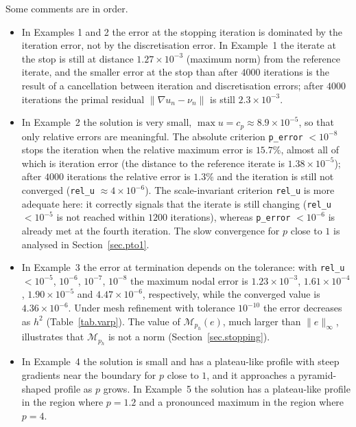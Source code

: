 \documentclass[11pt]{amsart}
\theoremstyle{definition}
\theoremstyle{remark}
\numberwithin{equation}{section}
\begin{document}
Some comments are in order.
\begin{itemize}
\item In Examples 1 and 2 the error at the stopping iteration is dominated by the iteration error, not by the discretisation error. In Example~1 the iterate at the stop is still at distance $1.27\times10^{-3}$ (maximum norm) from the reference iterate, and the smaller error at the stop than after $4000$ iterations is the result of a cancellation between iteration and discretisation errors; after $4000$ iterations the primal residual $\|\nabla u_n-\nu_n\|$ is still $2.3\times10^{-3}$.
\item In Example~2 the solution is very small, $\max u=c_p\approx8.9\times10^{-5}$, so that only relative errors are meaningful. The absolute criterion \texttt{p\_error} $<10^{-8}$ stops the iteration when the relative maximum error is $15.7\%$, almost all of which is iteration error (the distance to the reference iterate is $1.38\times10^{-5}$); after $4000$ iterations the relative error is $1.3\%$ and the iteration is still not converged (\texttt{rel\_u} $\approx4\times10^{-6}$). The scale-invariant criterion \texttt{rel\_u} is more adequate here: it correctly signals that the iterate is still changing (\texttt{rel\_u} $<10^{-5}$ is not reached within $1200$ iterations), whereas \texttt{p\_error} $<10^{-6}$ is already met at the fourth iteration. The slow convergence for $p$ close to $1$ is analysed in Section~\ref{sec.pto1}.
\item In Example~3 the error at termination depends on the tolerance: with \texttt{rel\_u} $<10^{-5}$, $10^{-6}$, $10^{-7}$, $10^{-8}$ the maximum nodal error is $1.23\times10^{-3}$, $1.61\times10^{-4}$, $1.90\times10^{-5}$ and $4.47\times10^{-6}$, respectively, while the converged value is $4.36\times10^{-6}$. Under mesh refinement with tolerance $10^{-10}$ the error decreases as $h^2$ (Table~\ref{tab.varp}). The value of $\mathcal M_{p_h}(e)$, much larger than $\|e\|_\infty$, illustrates that $\mathcal M_{p_h}$ is not a norm (Section~\ref{sec.stopping}).
\item In Example~4 the solution is small and has a plateau-like profile with steep gradients near the boundary for $p$ close to $1$, and it approaches a pyramid-shaped profile as $p$ grows. In Example~5 the solution has a plateau-like profile in the region where $p=1.2$ and a pronounced maximum in the region where $p=4$.
\end{itemize}
\end{document}

